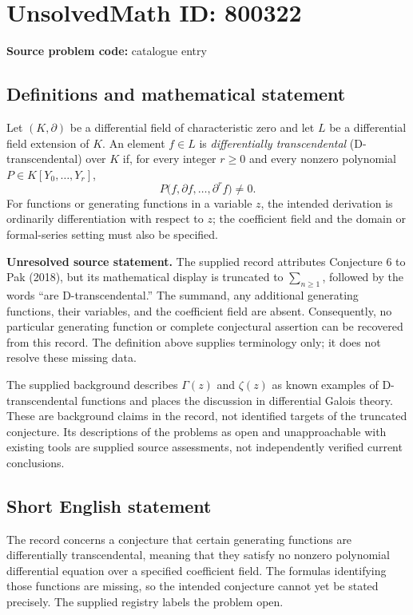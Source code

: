 \documentclass[11pt]{article}
\begin{document}
\section*{UnsolvedMath ID: 800322}
\textbf{Source problem code:} catalogue entry
\subsection{Definitions and mathematical statement}
Let \((K,\partial)\) be a differential field of characteristic zero and let \(L\) be a differential field extension of \(K\). An element \(f\in L\) is \emph{differentially transcendental} (D-transcendental) over \(K\) if, for every integer \(r\geq 0\) and every nonzero polynomial \(P\in K[Y_0,\ldots,Y_r]\),
\[
P\bigl(f,\partial f,\ldots,\partial^r f\bigr)\neq 0.
\]
For functions or generating functions in a variable \(z\), the intended derivation is ordinarily differentiation with respect to \(z\); the coefficient field and the domain or formal-series setting must also be specified.

\textbf{Unresolved source statement.} The supplied record attributes Conjecture 6 to Pak (2018), but its mathematical display is truncated to \(\sum_{n\geq 1}\), followed by the words ``are D-transcendental.'' The summand, any additional generating functions, their variables, and the coefficient field are absent. Consequently, no particular generating function or complete conjectural assertion can be recovered from this record. The definition above supplies terminology only; it does not resolve these missing data.

The supplied background describes \(\Gamma(z)\) and \(\zeta(z)\) as known examples of D-transcendental functions and places the discussion in differential Galois theory. These are background claims in the record, not identified targets of the truncated conjecture. Its descriptions of the problems as open and unapproachable with existing tools are supplied source assessments, not independently verified current conclusions.
\subsection{Short English statement}
The record concerns a conjecture that certain generating functions are differentially transcendental, meaning that they satisfy no nonzero polynomial differential equation over a specified coefficient field. The formulas identifying those functions are missing, so the intended conjecture cannot yet be stated precisely. The supplied registry labels the problem open.
\end{document}
